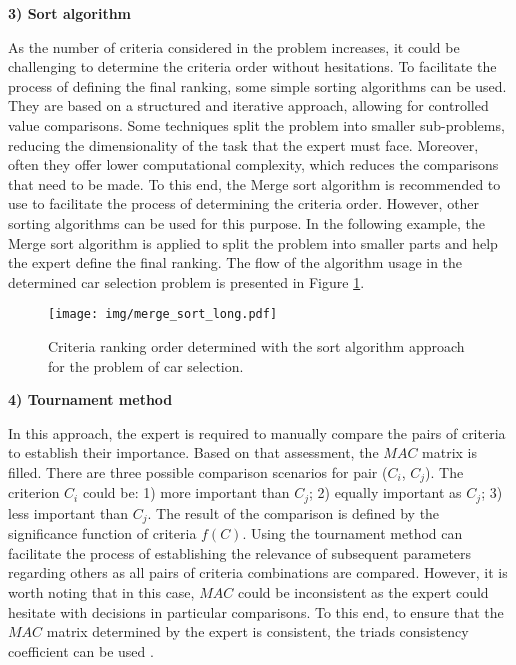 \noindent \textbf{3) Sort algorithm }

As the number of criteria considered in the problem increases, it could be challenging to determine the criteria order without hesitations. To facilitate the process of defining the final ranking, some simple sorting algorithms can be used. They are based on a structured and iterative approach, allowing for controlled value comparisons. Some techniques split the problem into smaller sub-problems, reducing the dimensionality of the task that the expert must face. Moreover, often they offer lower computational complexity, which reduces the comparisons that need to be made. To this end, the Merge sort algorithm is recommended to use to facilitate the process of determining the criteria order. However, other sorting algorithms can be used for this purpose. In the following example, the Merge sort algorithm is applied to split the problem into smaller parts and help the expert define the final ranking. The flow of the algorithm usage in the determined car selection problem is presented in Figure \ref{fig:example_ms}.

\begin{figure}[h!]
	\centerline{
    	\texttt{[image: img/merge\_sort\_long.pdf]}
	}
	\caption{Criteria ranking order determined with the sort algorithm approach for the problem of car selection.}
	\label{fig:example_ms}
\end{figure}

\noindent \textbf{4) Tournament method}

In this approach, the expert is required to manually compare the pairs of criteria to establish their importance. Based on that assessment, the $MAC$ matrix is filled. There are three possible comparison scenarios for pair ($C_{i}$, $C_j$). The criterion $C_i$ could be: 1) more important than $C_j$; 2) equally important as $C_j$; 3) less important than $C_j$. The result of the comparison is defined by the significance function of criteria $f(C)$. Using the tournament method can facilitate the process of establishing the relevance of subsequent parameters regarding others as all pairs of criteria combinations are compared. However, it is worth noting that in this case, $MAC$ could be inconsistent as the expert could hesitate with decisions in particular comparisons. To this end, to ensure that the $MAC$ matrix determined by the expert is consistent, the triads consistency coefficient can be used \cite{salabun2021new}.
